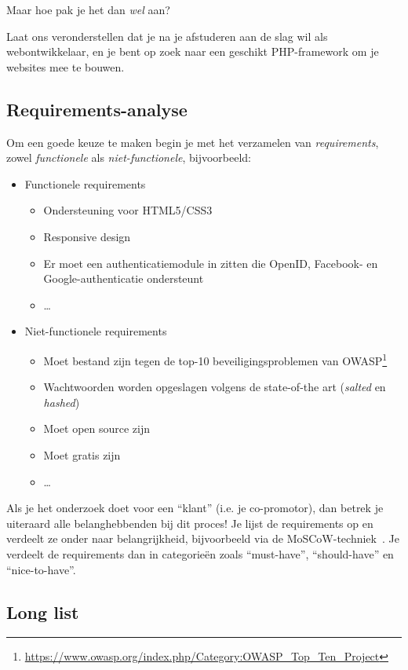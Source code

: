 Maar hoe pak je het dan \emph{wel} aan?

Laat ons veronderstellen dat je na je afstuderen aan de slag wil als webontwikkelaar, en je bent op zoek naar een geschikt PHP-framework om je websites mee te bouwen.

\subsection{Requirements-analyse}
\label{ssec:requirements-analyse}

Om een goede keuze te maken begin je met het verzamelen van \emph{requirements}, zowel \textit{functionele} als \emph{niet-functionele}, bijvoorbeeld:

\begin{itemize}
\item Functionele requirements
  \begin{itemize}
  \item Ondersteuning voor HTML5/CSS3
  \item Responsive design
  \item Er moet een authenticatiemodule in zitten die OpenID, Facebook- en Google-authenticatie ondersteunt
  \item \ldots
  \end{itemize}
\item Niet-functionele requirements
  \begin{itemize}
  \item Moet bestand zijn tegen de top-10 beveiligingsproblemen van OWASP\footnote{\url{https://www.owasp.org/index.php/Category:OWASP_Top_Ten_Project}}
  \item Wachtwoorden worden opgeslagen volgens de state-of-the art (\emph{salted} en \emph{hashed})
  \item Moet open source zijn
  \item Moet gratis zijn
  \item \ldots
  \end{itemize}
\end{itemize}

Als je het onderzoek doet voor een ``klant'' (i.e. je co-promotor), dan betrek je uiteraard alle belanghebbenden bij dit proces! Je lijst de requirements op en verdeelt ze onder naar belangrijkheid, bijvoorbeeld via de MoSCoW-techniek~\parencite{Nordenstam2014}. Je verdeelt de requirements dan in categorieën zoals ``must-have'', ``should-have'' en ``nice-to-have''.

\subsection{Long list}
\label{ssec:long-list}

